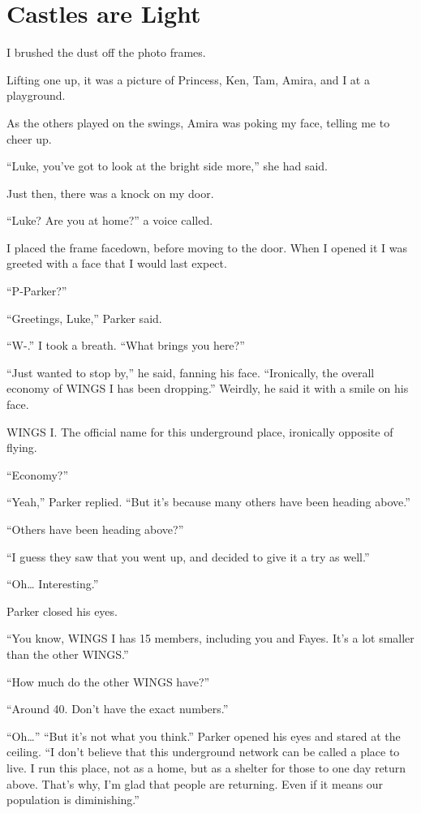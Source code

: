 \section{Castles are Light}
I brushed the dust off the photo frames.

Lifting one up, it was a picture of Princess, Ken, Tam, Amira, and I at a playground.

As the others played on the swings, Amira was poking my face, telling me to cheer up. 

“Luke, you’ve got to look at the bright side more,” she had said.

Just then, there was a knock on my door.

“Luke? Are you at home?” a voice called.

I placed the frame facedown, before moving to the door. When I opened it I was greeted with a face that I would last expect.

“P-Parker?”

“Greetings, Luke,” Parker said. 

“W-.” I took a breath. “What brings you here?”

“Just wanted to stop by,” he said, fanning his face. “Ironically, the overall economy of WINGS I has been dropping.” Weirdly, he said it with a smile on his face.

WINGS I. The official name for this underground place, ironically opposite of flying.

“Economy?”

“Yeah,” Parker replied. “But it’s because many others have been heading above.”

“Others have been heading above?”

“I guess they saw that you went up, and decided to give it a try as well.”

“Oh… Interesting.”

Parker closed his eyes.

“You know, WINGS I has 15 members, including you and Fayes. It’s a lot smaller than the other WINGS.”

“How much do the other WINGS have?”

“Around 40. Don’t have the exact numbers.”

“Oh…”
“But it’s not what you think.” Parker opened his eyes and stared at the ceiling. “I don’t believe that this underground network can be called a place to live. I run this place, not as a home, but as a shelter for those to one day return above. That’s why, I’m glad that people are returning. Even if it means our population is diminishing.”

